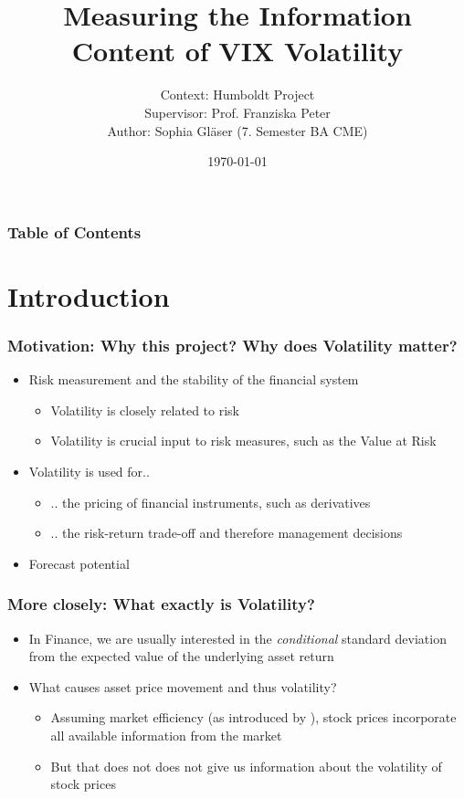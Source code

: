 \documentclass[aspectratio=169]{beamer}
\title{Measuring the Information Content of VIX Volatility}
\author{Context: Humboldt Project\\
Supervisor: Prof. Franziska Peter\\
Author: Sophia Gläser (7. Semester BA CME)}
\date{\small \today}
\begin{document}
\begin{frame}
\maketitle
\end{frame}

\begin{frame}
\frametitle{Table of Contents}
\tableofcontents
\end{frame}

\section{Introduction}

\begin{frame}
\frametitle{Motivation: Why this project? Why does Volatility matter?}
	\begin{itemize}
	\item<1-> Risk measurement and the stability of the financial system
		\begin{itemize}
		\item<1-> Volatility is closely related to risk 
		\item<1-> Volatility is crucial input to risk measures, such as the Value at Risk
		\end{itemize}
	\item<2-> Volatility is used for..
		\begin{itemize}
		\item<2-> .. the pricing of financial instruments, such as derivatives
		\item<2-> .. the risk-return trade-off and therefore management decisions
		\end{itemize}
	\item<3-> Forecast potential
	\end{itemize}
\end{frame}

\begin{frame}
\frametitle{More closely: What exactly is Volatility?}
	\begin{itemize}
	\item<1-> In Finance, we are usually interested in the \textit{conditional} standard deviation from the expected value of the underlying asset return \parencite{tsay2005}
	\item<2-> What causes asset price movement and thus volatility?
		\begin{itemize}
		\item<3-> Assuming market efficiency (as introduced by \citeauthor{fama1970}), stock prices incorporate all available information from the market
		\item<3-> But that does not does not give us information about the volatility of stock prices
		\end{itemize}
	\end{itemize}
\end{frame}
\end{document}
